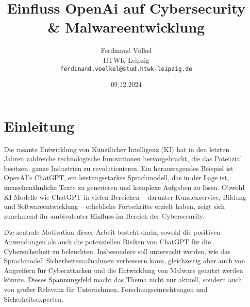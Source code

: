 \documentclass[a4paper,10pt,parskip,twocolumn]{article}
\title {Einfluss OpenAi auf Cybersecurity \& Malwareentwicklung }
\author{
	\Large Ferdinand Völkel \\[2mm]
	\normalsize HTWK Leipzig \\
	\texttt{ferdinand.voelkel@stud.htwk-leipzig.de}
}
\date{09.12.2024}
\begin{document}

\section{Einleitung}

Die rasante Entwicklung von Künstlicher Intelligenz (KI) hat in den letzten Jahren zahlreiche technologische Innovationen hervorgebracht, die das Potenzial besitzen, ganze Industrien zu revolutionieren. Ein herausragendes Beispiel ist OpenAI's ChatGPT, ein leistungsstarkes Sprachmodell, das in der Lage ist, menschenähnliche Texte zu generieren und komplexe Aufgaben zu lösen. Obwohl KI-Modelle wie ChatGPT in vielen Bereichen – darunter Kundenservice, Bildung und Softwareentwicklung – erhebliche Fortschritte erzielt haben, zeigt sich zunehmend ihr ambivalenter Einfluss im Bereich der Cybersecurity.

Die zentrale Motivation dieser Arbeit besteht darin, sowohl die positiven Anwendungen als auch die potenziellen Risiken von ChatGPT für die Cybersicherheit zu beleuchten. Insbesondere soll untersucht werden, wie das Sprachmodell Sicherheitsmaßnahmen verbessern kann, gleichzeitig aber auch von Angreifern für Cyberattacken und die Entwicklung von Malware genutzt werden könnte. Dieses Spannungsfeld macht das Thema nicht nur aktuell, sondern auch von großer Relevanz für Unternehmen, Forschungseinrichtungen und Sicherheitsexperten.
\end{document}
